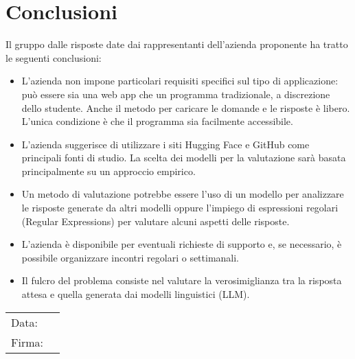 \documentclass[a4paper, 12pt]{article}
\begin{document}
\section{Conclusioni}
Il gruppo dalle risposte date dai rappresentanti dell’azienda proponente ha tratto le seguenti conclusioni:
\begin{itemize}
    \item L’azienda non impone particolari requisiti specifici sul tipo di applicazione: può essere sia una web app che un programma tradizionale, a discrezione dello studente. Anche il metodo per caricare le domande e le risposte è libero. L’unica condizione è che il programma sia facilmente accessibile.
    
    \item L’azienda suggerisce di utilizzare i siti Hugging Face e GitHub come principali fonti di studio. La scelta dei modelli per la valutazione sarà basata principalmente su un approccio empirico. 
   
    \item Un metodo di valutazione potrebbe essere l'uso di un modello per analizzare le risposte generate da altri modelli oppure l’impiego di espressioni regolari (Regular Expressions) per valutare alcuni aspetti delle risposte.
    
    \item L'azienda è disponibile per eventuali richieste di supporto e, se necessario, è possibile organizzare incontri regolari o settimanali.
    
    \item Il fulcro del problema consiste nel valutare la verosimiglianza tra la risposta attesa e quella generata dai modelli linguistici (LLM).
\end{itemize}
\vfill
{\renewcommand{\arraystretch}{2}
\begin{tabular}{l p{5cm}}
    Data: &  \hrulefill \\
    Firma: & \hrulefill \\
\end{tabular}
}
\end{document}
